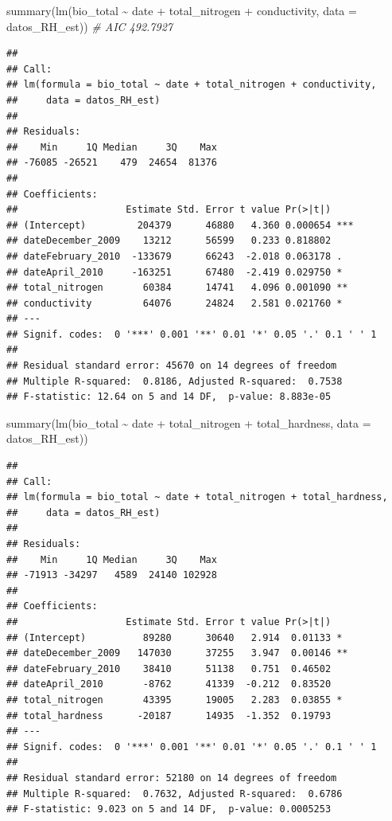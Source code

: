 \documentclass[
]{book}
\newenvironment{Shaded}{\begin{snugshade}}{\end{snugshade}}
\newcommand{\AttributeTok}[1]{\textcolor[rgb]{0.77,0.63,0.00}{#1}}
\newcommand{\CommentTok}[1]{\textcolor[rgb]{0.56,0.35,0.01}{\textit{#1}}}
\newcommand{\FunctionTok}[1]{\textcolor[rgb]{0.00,0.00,0.00}{#1}}
\newcommand{\NormalTok}[1]{#1}
\newcommand{\SpecialCharTok}[1]{\textcolor[rgb]{0.00,0.00,0.00}{#1}}
\begin{document}
\begin{Shaded}
\begin{Highlighting}[]
\FunctionTok{summary}\NormalTok{(}\FunctionTok{lm}\NormalTok{(bio\_total }\SpecialCharTok{\textasciitilde{}}\NormalTok{ date }\SpecialCharTok{+}\NormalTok{ total\_nitrogen }\SpecialCharTok{+}\NormalTok{ conductivity, }\AttributeTok{data =}\NormalTok{ datos\_RH\_est)) }\CommentTok{\# AIC 492.7927}
\end{Highlighting}
\end{Shaded}

\begin{verbatim}
## 
## Call:
## lm(formula = bio_total ~ date + total_nitrogen + conductivity, 
##     data = datos_RH_est)
## 
## Residuals:
##    Min     1Q Median     3Q    Max 
## -76085 -26521    479  24654  81376 
## 
## Coefficients:
##                   Estimate Std. Error t value Pr(>|t|)    
## (Intercept)         204379      46880   4.360 0.000654 ***
## dateDecember_2009    13212      56599   0.233 0.818802    
## dateFebruary_2010  -133679      66243  -2.018 0.063178 .  
## dateApril_2010     -163251      67480  -2.419 0.029750 *  
## total_nitrogen       60384      14741   4.096 0.001090 ** 
## conductivity         64076      24824   2.581 0.021760 *  
## ---
## Signif. codes:  0 '***' 0.001 '**' 0.01 '*' 0.05 '.' 0.1 ' ' 1
## 
## Residual standard error: 45670 on 14 degrees of freedom
## Multiple R-squared:  0.8186, Adjusted R-squared:  0.7538 
## F-statistic: 12.64 on 5 and 14 DF,  p-value: 8.883e-05
\end{verbatim}

\begin{Shaded}
\begin{Highlighting}[]
\FunctionTok{summary}\NormalTok{(}\FunctionTok{lm}\NormalTok{(bio\_total }\SpecialCharTok{\textasciitilde{}}\NormalTok{ date }\SpecialCharTok{+}\NormalTok{ total\_nitrogen }\SpecialCharTok{+}\NormalTok{ total\_hardness, }\AttributeTok{data =}\NormalTok{ datos\_RH\_est)) }
\end{Highlighting}
\end{Shaded}

\begin{verbatim}
## 
## Call:
## lm(formula = bio_total ~ date + total_nitrogen + total_hardness, 
##     data = datos_RH_est)
## 
## Residuals:
##    Min     1Q Median     3Q    Max 
## -71913 -34297   4589  24140 102928 
## 
## Coefficients:
##                   Estimate Std. Error t value Pr(>|t|)   
## (Intercept)          89280      30640   2.914  0.01133 * 
## dateDecember_2009   147030      37255   3.947  0.00146 **
## dateFebruary_2010    38410      51138   0.751  0.46502   
## dateApril_2010       -8762      41339  -0.212  0.83520   
## total_nitrogen       43395      19005   2.283  0.03855 * 
## total_hardness      -20187      14935  -1.352  0.19793   
## ---
## Signif. codes:  0 '***' 0.001 '**' 0.01 '*' 0.05 '.' 0.1 ' ' 1
## 
## Residual standard error: 52180 on 14 degrees of freedom
## Multiple R-squared:  0.7632, Adjusted R-squared:  0.6786 
## F-statistic: 9.023 on 5 and 14 DF,  p-value: 0.0005253
\end{verbatim}
\end{document}
